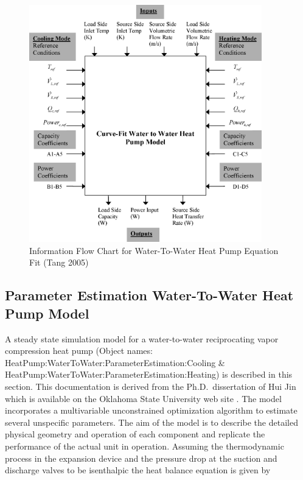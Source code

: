 \begin{figure}[hbtp] %
\centering
\includegraphics[width=0.9\textwidth, height=0.9\textheight, keepaspectratio=true]{media/image5290.png}
\caption{Information Flow Chart for Water-To-Water Heat Pump Equation Fit (Tang 2005) \protect \label{fig:information-flow-chart-for-water-to-water}}
\end{figure}

\subsection{Parameter Estimation Water-To-Water Heat Pump Model}\label{parameter-estimation-water-to-water-heat-pump-model}

A steady state simulation model for a water-to-water reciprocating vapor compression heat pump (Object names: HeatPump:WaterToWater:ParameterEstimation:Cooling \& HeatPump:WaterToWater:ParameterEstimation:Heating) is described in this section. This documentation is derived from the Ph.D.~dissertation of Hui Jin which is available on the Oklahoma State University web site . The model incorporates a multivariable unconstrained optimization algorithm to estimate several unspecific parameters. The aim of the model is to describe the detailed physical geometry and operation of each component and replicate the performance of the actual unit in operation. Assuming the thermodynamic process in the expansion device and the pressure drop at the suction and discharge valves to be isenthalpic the heat balance equation is given by

